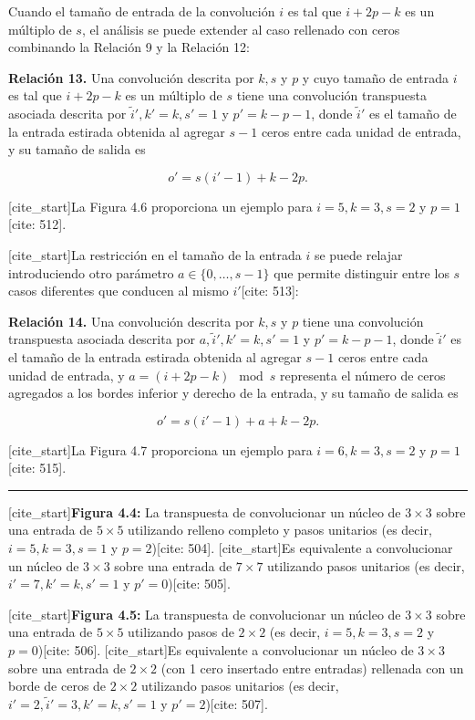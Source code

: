 \documentclass[
  super,
  preprint,
  3p]{elsarticle}
\begin{document}
Cuando el tamaño de entrada de la convolución \(i\) es tal que
\(i + 2p - k\) es un múltiplo de \(s\), el análisis se puede extender al
caso rellenado con ceros combinando la Relación 9 y la Relación 12:

\textbf{Relación 13.} Una convolución descrita por \(k, s\) y \(p\) y
cuyo tamaño de entrada \(i\) es tal que \(i + 2p - k\) es un múltiplo de
\(s\) tiene una convolución transpuesta asociada descrita por
\(\tilde{i}', k' = k, s' = 1\) y \(p' = k - p - 1\), donde
\(\tilde{i}'\) es el tamaño de la entrada estirada obtenida al agregar
\(s - 1\) ceros entre cada unidad de entrada, y su tamaño de salida es

\[o' = s(i' - 1) + k - 2p.\]

{[}cite\_start{]}La Figura 4.6 proporciona un ejemplo para
\(i = 5, k = 3, s = 2\) y \(p = 1\){[}cite: 512{]}.

{[}cite\_start{]}La restricción en el tamaño de la entrada \(i\) se
puede relajar introduciendo otro parámetro \(a \in \{0, \dots, s - 1\}\)
que permite distinguir entre los \(s\) casos diferentes que conducen al
mismo \(i'\){[}cite: 513{]}:

\textbf{Relación 14.} Una convolución descrita por \(k, s\) y \(p\)
tiene una convolución transpuesta asociada descrita por
\(a, \tilde{i}', k' = k, s' = 1\) y \(p' = k - p - 1\), donde
\(\tilde{i}'\) es el tamaño de la entrada estirada obtenida al agregar
\(s - 1\) ceros entre cada unidad de entrada, y
\(a = (i + 2p - k) \mod s\) representa el número de ceros agregados a
los bordes inferior y derecho de la entrada, y su tamaño de salida es

\[o' = s(i' - 1) + a + k - 2p.\]

{[}cite\_start{]}La Figura 4.7 proporciona un ejemplo para
\(i = 6, k = 3, s = 2\) y \(p = 1\){[}cite: 515{]}.

\begin{center}\rule{0.5\linewidth}{0.5pt}\end{center}

{[}cite\_start{]}\textbf{Figura 4.4:} La transpuesta de convolucionar un
núcleo de \(3 \times 3\) sobre una entrada de \(5 \times 5\) utilizando
relleno completo y pasos unitarios (es decir, \(i = 5, k = 3, s = 1\) y
\(p = 2\)){[}cite: 504{]}. {[}cite\_start{]}Es equivalente a
convolucionar un núcleo de \(3 \times 3\) sobre una entrada de
\(7 \times 7\) utilizando pasos unitarios (es decir,
\(i' = 7, k' = k, s' = 1\) y \(p' = 0\)){[}cite: 505{]}.

{[}cite\_start{]}\textbf{Figura 4.5:} La transpuesta de convolucionar un
núcleo de \(3 \times 3\) sobre una entrada de \(5 \times 5\) utilizando
pasos de \(2 \times 2\) (es decir, \(i = 5, k = 3, s = 2\) y
\(p = 0\)){[}cite: 506{]}. {[}cite\_start{]}Es equivalente a
convolucionar un núcleo de \(3 \times 3\) sobre una entrada de
\(2 \times 2\) (con 1 cero insertado entre entradas) rellenada con un
borde de ceros de \(2 \times 2\) utilizando pasos unitarios (es decir,
\(i' = 2, \tilde{i}' = 3, k' = k, s' = 1\) y \(p' = 2\)){[}cite: 507{]}.
\end{document}
